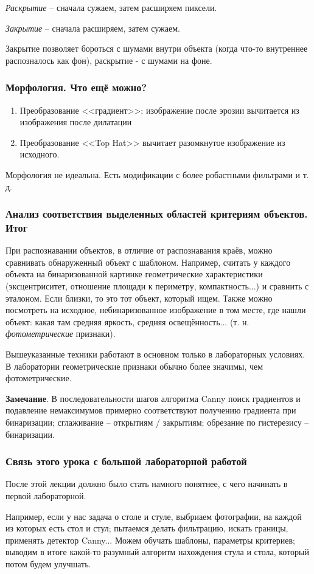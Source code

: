\documentclass[main.tex]{subfiles}
\begin{document}
\emph{Раскрытие} -- сначала сужаем, затем расширяем пиксели.

\emph{Закрытие} -- сначала расширяем, затем сужаем.

Закрытие позволяет бороться с шумами внутри объекта (когда что-то внутреннее распозналось как фон), раскрытие - с шумами на фоне.

\subsubsection{Морфология. Что ещё можно?}

\begin{enumerate}[noitemsep]
	\item  Преобразование <<градиент>>: изображение после эрозии вычитается из изображения после дилатации
	\item Преобразование <<Top Hat>> вычитает разомкнутое изображение из исходного.
\end{enumerate}

Морфология не идеальна. Есть модификации с более робастными фильтрами и т. д.


\subsubsection{Анализ соответствия выделенных областей критериям объектов. Итог}

При распознавании объектов, в отличие от распознавания краёв, можно сравнивать обнаруженный объект с шаблоном.
Например, считать у каждого объекта на бинаризованной картинке геометрические характеристики (эксцентриситет, отношение площади к периметру, компактность...) и сравнить с эталоном.
Если близки, то это тот объект, который ищем.
Также можно посмотреть на исходное, небинаризованное изображение в том месте, где нашли объект: какая там средняя яркость, средняя освещённость... (т. н. \emph{фотометрические} признаки).

Вышеуказанные техники работают в основном только в лабораторных условиях.
В лаборатории геометрические признаки обычно более значимы, чем фотометрические.

\textbf{Замечание}. В последовательности шагов алгоритма Canny поиск градиентов и подавление немаксимумов примерно соответствуют получению градиента при бинаризации; сглаживание -- открытиям / закрытиям; обрезание по гистерезису -- бинаризации.

\subsubsection{Связь этого урока с большой лабораторной работой}

После этой лекции должно было стать намного понятнее, с чего начинать в первой лабораторной.

Например, если у нас задача о столе и стуле, выбриаем фотографии, на каждой из которых есть стол и стул; пытаемся делать фильтрацию, искать границы, применять детектор Canny...
Можем обучать шаблоны, параметры критериев; выводим в итоге какой-то разумный алгоритм нахождения стула и стола, который потом будем улучшать.
\end{document}
